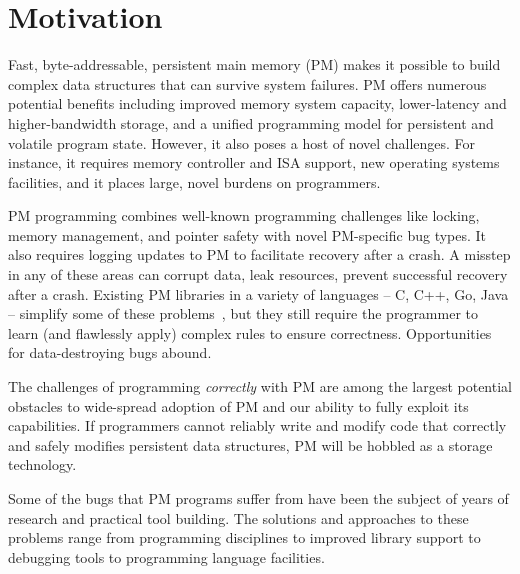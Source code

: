 \documentclass[pageno]{jpaper}
\theoremstyle{invar}
\theoremstyle{goal}
\begin{document}
\title{\papertitle}

\author{Morteza Hoseinzadeh and Steven Swanson\\
University of California, San Diego} 
\date{}

\maketitle

\thispagestyle{empty}

\section{Motivation}
\label{sec:motivation}

Fast, byte-addressable, persistent main memory (PM) makes it possible to build
complex data structures that can survive system failures.  PM offers
numerous potential benefits including improved memory system capacity,
lower-latency and higher-bandwidth storage, and a unified programming model for
persistent and volatile program state.  However, it also poses a host of novel
challenges.  For instance, it requires memory controller and ISA support, new operating
systems facilities, and it places large, novel burdens on programmers.

PM programming combines well-known programming challenges like locking, memory
management, and pointer safety with novel PM-specific bug types.  It also
requires logging updates to PM to facilitate recovery after a crash.  A misstep
in any of these areas can corrupt data, leak resources, prevent successful
recovery after a crash.  Existing PM libraries in a variety of languages -- C,
C++, Go, Java -- simplify some of these
problems~\cite{pmdk,nvheaps,oracle-nvm-direct,atlas,mnemosyne}, but they still
require the programmer to learn (and flawlessly apply) complex rules to ensure
correctness.  Opportunities for data-destroying bugs abound.

The challenges of programming \emph{correctly} with PM are among the largest
potential obstacles to wide-spread adoption of PM and our ability to fully
exploit its capabilities.  If programmers cannot reliably write and modify code
that correctly and safely modifies persistent data structures, PM will be
hobbled as a storage technology.

Some of the bugs that PM programs suffer from have been the subject of
years of research and practical tool building.  The solutions and approaches to
these problems range from programming disciplines to improved library support
to debugging tools to programming language facilities.
\end{document}
